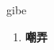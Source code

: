 
\begin{frame}
{\huge gibe}
\begin{center}
\begin{enumerate}\Large
  \item \textbf{嘲弄}
\end{enumerate}
\end{center}
\end{frame}
